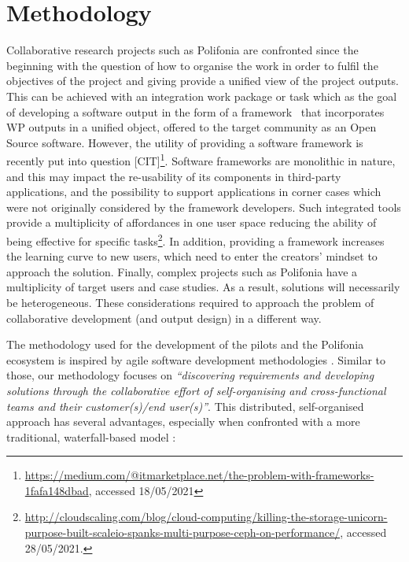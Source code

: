 \chapter{Methodology}\label{ch:methodology}
Collaborative research projects such as Polifonia are confronted since the beginning with the question of how to organise the work in order to fulfil the objectives of the project and giving provide a unified view of the project outputs.
This can be achieved with an integration work package or task which as the goal of developing a software output in the form of a framework~\cite{johnson1997frameworks} that incorporates WP outputs in a unified object, offered to the target community as an Open Source software. 
However, the utility of providing a software framework is recently put into question [CIT]\footnote{\url{https://medium.com/@itmarketplace.net/the-problem-with-frameworks-1fafa148dbad}, accessed 18/05/2021}. 
Software frameworks are monolithic in nature, and this may impact the re-usability of its components in third-party applications, and the possibility to support applications in corner cases which were not originally considered by the framework developers. 
Such integrated tools provide a multiplicity of affordances in one user space reducing the ability of being effective for specific tasks\footnote{\url{http://cloudscaling.com/blog/cloud-computing/killing-the-storage-unicorn-purpose-built-scaleio-spanks-multi-purpose-ceph-on-performance/}, accessed 28/05/2021.}.
In addition, providing a framework increases the learning curve to new users, which need to enter the creators' mindset to approach the solution.
Finally, complex projects such as Polifonia have a multiplicity of target users and case studies. 
As a result, solutions will necessarily be heterogeneous.
These considerations required to approach the problem of collaborative development (and output design) in a different way.

The methodology used for the development of the pilots and the Polifonia ecosystem is inspired by agile software development methodologies \cite{collier2012agile}. 
Similar to those, our methodology focuses on \textit{``discovering requirements and developing solutions through the collaborative effort of self-organising and cross-functional teams and their customer(s)/end user(s)''}. 
This distributed, self-organised approach has several advantages, especially when confronted with a more traditional, waterfall-based model \cite{benington1983production}:

